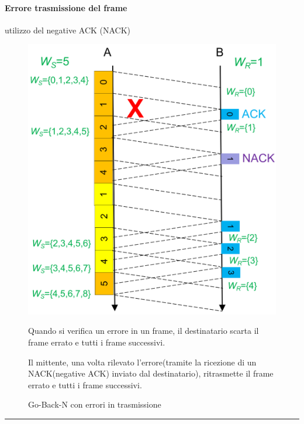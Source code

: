 \paragraph{Errore trasmissione del frame} utilizzo del negative ACK (NACK)
\begin{figure}[htbp]
    \centering
    \begin{minipage}{0.4\textwidth}
        \includegraphics[width=\linewidth]{images/gobackinerrori.png}
        \caption{Go-Back-N con errori in trasmissione}
    \end{minipage}%
    \hfill
    \begin{minipage}{0.55\textwidth}
        Quando si verifica un errore in un frame, il destinatario scarta il frame errato e tutti i frame successivi. 
        
        Il mittente, una volta rilevato l'errore(tramite la ricezione di un NACK(negative ACK) inviato dal destinatario), ritrasmette il frame errato e tutti i frame successivi.
    \end{minipage}
\end{figure}

\vspace{1em}
\noindent\rule{\linewidth}{0.4pt}
\vspace{1em}

